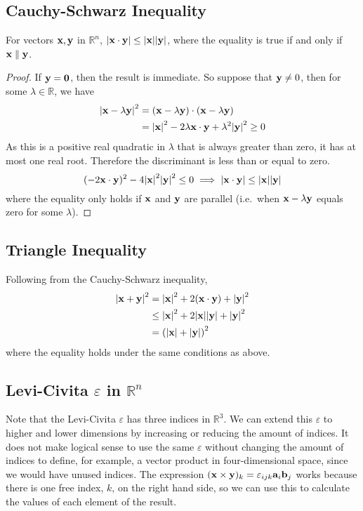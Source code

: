 \subsection{Cauchy-Schwarz Inequality}
\begin{proposition}
	For vectors \(\vb x, \vb y\) in \(\mathbb R^n\), \(\abs{\vb x \cdot \vb y} \leq \abs{\vb x} \abs{\vb y}\), where the equality is true if and only if \(\vb x \parallel \vb y\).
\end{proposition}
\begin{proof}
	If \(\vb y = \vb 0\), then the result is immediate.
	So suppose that \(\vb y \neq 0\), then for some \(\lambda \in \mathbb R\), we have
	\begin{align*}
		\abs{\vb x - \lambda \vb y}^2 & =
		(\vb x - \lambda \vb y) \cdot (\vb x - \lambda \vb y)                                                          \\
		                              & = \abs{\vb x}^2 - 2 \lambda \vb x \cdot \vb y + \lambda^2 \abs{\vb y}^2 \geq 0
	\end{align*}
	As this is a positive real quadratic in \(\lambda\) that is always greater than zero, it has at most one real root.
	Therefore the discriminant is less than or equal to zero.
	\[
		(-2 \vb x \cdot \vb y)^2 - 4 \abs{\vb x}^2\abs{\vb y}^2 \leq 0
		\implies \abs{\vb x \cdot \vb y} \leq \abs{\vb x}\abs{\vb y}
	\]
	where the equality only holds if \(\vb x\) and \(\vb y\) are parallel (i.e.\ when \(\vb x - \lambda \vb y\) equals zero for some \(\lambda\)).
\end{proof}

\subsection{Triangle Inequality}
Following from the Cauchy-Schwarz inequality,
\begin{align*}
	\abs{\vb x + \vb y}^2
	 & = \abs{\vb x}^2 + 2(\vb x \cdot \vb y) + \abs{\vb y}^2        \\
	 & \leq \abs{\vb x}^2 + 2 \abs{\vb x}\abs{\vb y} + \abs{\vb y}^2 \\
	 & = \left(\abs{\vb x} + \abs{\vb y}\right)^2
\end{align*}
where the equality holds under the same conditions as above.

\subsection{Levi-Civita \(\varepsilon\) in \(\mathbb R^n\)}
Note that the Levi-Civita \(\varepsilon\) has three indices in \(\mathbb R^3\).
We can extend this \(\varepsilon\) to higher and lower dimensions by increasing or reducing the amount of indices.
It does not make logical sense to use the same \(\varepsilon\) without changing the amount of indices to define, for example, a vector product in four-dimensional space, since we would have unused indices.
The expression \((\vb x \times \vb y)_k = \varepsilon_{ijk} \vb a_i \vb b_j\) works because there is one free index, \(k\), on the right hand side, so we can use this to calculate the values of each element of the result.

